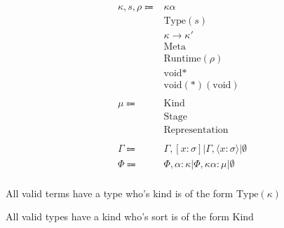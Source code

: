 \documentclass {article}
\begin{document}
\begin{align*}
\\
\kappa, s, \rho \Coloneqq &  \kappa \alpha \tag*{[Kind Variable]} \\
& \text{Type} (s) \tag*{[Type]} \\
& \kappa \to \kappa' \tag*{[Higher Kinded Type]} \\
& \text{Meta} \tag*{[Meta Stage]}\\
& \text{Runtime} (\rho) \tag*{[Runtime Stage]}\\
& \text{void}* \tag*{[Pointer Representation]}\\
& \text{void}(*)(\text{void}) \tag*{[Function Pointer Representation]}\\
\\
\mu \Coloneqq & \text{Kind} \\
& \text{Stage} \\
& \text{Representation} \\
\\
\Gamma \Coloneqq & \Gamma, [x : \sigma] | \Gamma, \langle x : \sigma \rangle | \emptyset \\
\Phi \Coloneqq & \Phi, \alpha : \kappa | \Phi, \kappa \alpha : \mu |  \emptyset \\
\end{align*}

All valid terms have a type who's kind is of the form $ \text{Type} (\kappa) $

All valid types have a kind who's sort is of the form $ \text{Kind} $
\end{document}
